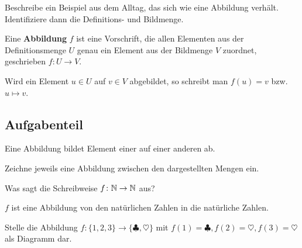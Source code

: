 \documentclass[]{uebungsblatt}
\begin{document}
\begin{exercise}
    Beschreibe ein Beispiel aus dem Alltag, das sich wie eine Abbildung verhält. Identifiziere dann die Definitions- und Bildmenge.
    \begin{answerbox}[.5in]
    \end{answerbox}
\end{exercise}

\begin{definition}
    \parpic[r]{
        
    }
    
    Eine \textbf{Abbildung} $f$ ist eine Vorschrift, die allen Elementen aus der Definitionsmenge $U$ genau ein Element aus der Bildmenge $V$ zuordnet, geschrieben $f\colon U\rightarrow V$. 
    
    Wird ein Element $u\in U$ auf $v\in V$ abgebildet, so schreibt man $f(u)=v$ bzw. $u\mapsto v$.
\end{definition}

\subsection*{Aufgabenteil}
\begin{exercise}
    Eine Abbildung bildet  Element einer  auf   einer anderen  ab.
\end{exercise}

\begin{exercise}
    Zeichne jeweils eine Abbildung zwischen den dargestellten Mengen ein.
    \begin{multicols}{2}
        
        
        
    \end{multicols}
\end{exercise}

\begin{exercise}
    Was sagt die Schreibweise $f\colon\mathbb{N}\rightarrow\mathbb{N}$ aus?
    \begin{answerbox}[0.6in]
        $f$ ist eine Abbildung von den natürlichen Zahlen in die natürliche Zahlen.
    \end{answerbox}
\end{exercise}

\begin{exercise}
    Stelle die Abbildung $f\colon\{1,2,3\}\rightarrow\{\clubsuit,\heartsuit\}$ mit $f(1)=\clubsuit, f(2)=\heartsuit, f(3)=\heartsuit$ als Diagramm dar.
    \begin{answerbox}[1in]
    \end{answerbox}
\end{exercise}

\end{document}
